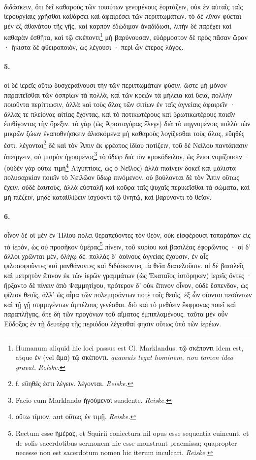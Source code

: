 \documentclass[a4paper, 11pt, oneside, polutonikogreek, german, landscape]{article}
\begin{document}
\paragraph{}
διδάσκειν, ὅτι δεῖ καθαροὺς τῶν τοιούτων γενομένους ἑορτάζειν, οὐκ ἐν αὐταῖς ταῖς ἱερουργίαις χρῆσθαι καθάρσει καὶ ἀφαιρέσει τῶν περιττωμάτων. τὸ δὲ λῖνον φύεται μὲν ἐξ ἀθανάτου τῆς γῆς, καὶ καρπὸν ἐδώδιμον ἀναδίδωσι, λιτὴν δὲ παρέχει καὶ καθαρὰν ἐσθῆτα, καὶ τῷ σκέποντι\footnote{Humanum aliquid hic loci passus est Cl. Marklandus. τῷ σκέποντι idem est, atque ἐν (vel ἅμα) τῷ σκέποντι. \emph{quamuis tegat hominem, non tamen ideo gravat.} \emph{Reiske.}} μὴ βαρύνουσαν, εὐάρμοστον δὲ πρὸς πᾶσαν ὥραν · ἥκιστα δὲ φθειροποιὸν, ὡς λέγουσι · περὶ ὧν ἕτερος λόγος.

\paragraph{5.}
οἱ δὲ ἱερεῖς οὕτω δυσχεραίνουσι τὴν τῶν περιττωμάτων φύσιν, ὥστε μὴ μόνον παραιτεῖσθαι τῶν ὀσπρίων τὰ πολλὰ, καὶ τῶν κρεῶν τὰ μήλεια καὶ ὕεια, πολλὴν ποιοῦντα περίττωσιν, ἀλλὰ καὶ τοὺς ἅλας τῶν σιτίων ἐν ταῖς ἁγνείαις ἀφαιρεῖν · ἄλλας τε πλείονας αἰτίας ἔχοντας, καὶ τὸ ποτικωτέρους καὶ βρωτικωτέρους ποιεῖν ἐπιθίγοντας τὴν ὄρεξιν. τὸ γὰρ (ὡς Ἀρισταγόρας ἔλεγε) διὰ τὸ πηγνυμένοις πολλὰ τῶν μικρῶν ζώων ἐναποθνήσκειν ἁλισκόμενα μὴ καθαροὺς λογίζεσθαι τοὺς ἅλας, εὔηθές ἐστι. λέγονται\footnote{f. εὒηθές ἐστι λέγειν. λέγονται. \emph{Reiske.}} δὲ καὶ τὸν Ἆπιν ἐκ φρέατος ἰδίου ποτίζειν, τοῦ δὲ Νείλου παντάπασιν ἀπείργειν, οὐ μιαρὸν ἡγουμένος\footnote{Facio cum Marklando ἡγούμενοι suadente. \emph{Reiske.}} τὸ ὕδωρ διὰ τὸν κροκόδειλον, ὡς ἔνιοι νομίζουσιν · (οὐδὲν γὰρ οὕτω τιμὴ\footnote{οὕτω τίμιον, aut οὕτως ἐν τιμῇ. \emph{Reiske.}} Αἰγυπτίοις, ὡς ὁ Νεῖλος) ἀλλὰ πιαίνειν δοκεῖ καὶ μάλιστα πολυσαρκίαν ποιεῖν τὸ Νειλῶον ὕδωρ πινόμενον. οὐ βούλονται δὲ τὸν Ἆπιν οὕτως ἔχειν, οὐδὲ ἑαυτοὺς, ἀλλὰ εὐσταλῆ καὶ κοῦφα ταῖς ψυχαῖς περικεῖσθαι τὰ σώματα, καὶ μὴ πιέζειν, μηδὲ καταθλίβειν ἰσχύοντι τῷ θνητῷ, καὶ βαρύνοντι τὸ θεῖον.

\paragraph{6.}
οἶνον δὲ οἱ μὲν ἐν Ἡλίου πόλει θεραπεύοντες τὸν θεὸν, οὐκ εἰσφέρουσι τοπαράπαν εἰς τὸ ἱερόν, ὡς οὐ προσῆκον ὑμέρας\footnote{Rectum esse ἡμέρας, et Squirii coniectura nil opus esse sequentia euincunt, et de solis sacerdotibus sermonem hic esse monstrant praemissa; quapropter necesse non est sacerdotum nomen hic iterum inculcari. \emph{Reiske.}} πίνειν, τοῦ κυρίου καὶ βασιλέας ἐφορῶντος · οἱ δ' ἄλλοι χρῶνται μὲν, ὀλίγῳ δέ. πολλὰς δ' ἀοίνους ἁγνείας ἔχουσιν, ἐν αἷς φιλοσοφοῦντες καὶ μανθάνοντες καὶ διδάσκοντες τὰ θεῖα διατελοῦσιν. οἱ δὲ βασιλεῖς καὶ μετρητὸν ἔπινον ἐκ τῶν ἱερῶν γραμμάτων (ὡς Ἑκαταῖος ἱστόρηκεν) ἱερεῖς ὄντες · ἤρξαντο δὲ πίνειν ἀπὸ Ψαμμητίχου, πρότερον δ' οὐκ ἔπινον οἶνον, οὐδὲ ἔσπενδον, ὡς φίλιον θεοῖς, ἀλλ' ὡς αἷμα τῶν πολεμησάντων ποτὲ τοῖς θεοῖς, ἐξ ὧν οἴονται πεσόντων καὶ τῇ γῇ συμμιγέντων ἀμπέλους γενέσθαι. διὸ καὶ τὸ μεθύειν ἔκφρονας ποιεῖ καὶ παραπλῆγας, ἅτε δὴ τῶν προγόνων τοῦ αἵματος ἐμπιπλαμένους. ταῦτα μὲν οὖν Εὔδοξος ἐν τῇ δευτέρᾳ τῆς περιόδου λέγεσθαί φησιν οὕτως ὑπὸ τῶν ἱερέων.
\end{document}
